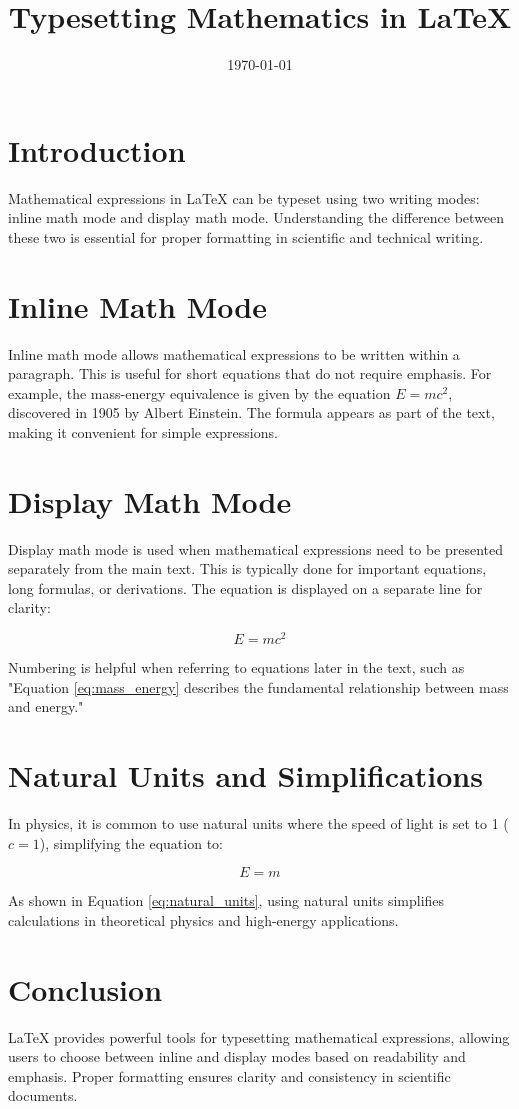 \documentclass[12pt, letterpaper]{article}
\title{Typesetting Mathematics in LaTeX}
\date{\today}
\begin{document}
\maketitle

\section{Introduction}
Mathematical expressions in LaTeX can be typeset using two writing modes: inline math mode and display math mode. Understanding the difference between these two is essential for proper formatting in scientific and technical writing.

\section{Inline Math Mode}
Inline math mode allows mathematical expressions to be written within a paragraph. 
This is useful for short equations that do not require emphasis. 
For example, the mass-energy equivalence is given by the equation $E=mc^2$, discovered in 1905 by Albert Einstein. 
The formula appears as part of the text, making it convenient for simple expressions.

\section{Display Math Mode}
Display math mode is used when mathematical expressions need to be presented separately from the main text. 
This is typically done for important equations, long formulas, or derivations. The equation is displayed on a separate line for clarity:

\begin{equation}
E=mc^2
\label{eq:mass_energy}
\end{equation}

Numbering is helpful when referring to equations later in the text, such as "Equation \ref{eq:mass_energy} describes the fundamental relationship between mass and energy."

\section{Natural Units and Simplifications}
In physics, it is common to use natural units where the speed of light is set to 1 ($c=1$), simplifying the equation to:

\begin{equation}
E=m
\label{eq:natural_units}
\end{equation}

As shown in Equation \ref{eq:natural_units}, using natural units simplifies calculations in theoretical physics and high-energy applications.

\section{Conclusion}
LaTeX provides powerful tools for typesetting mathematical expressions, allowing users to choose between inline and display modes based on readability and emphasis. Proper formatting ensures clarity and consistency in scientific documents.
\end{document}
